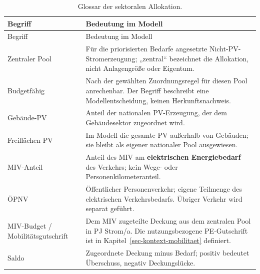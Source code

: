 \documentclass[
  ngerman,
  a4paper,
  DIV=11]{scrreprt}
\begin{document}
\begin{longtable}[]{@{}
  >{\raggedright\arraybackslash}p{}
  >{\raggedright\arraybackslash}p{}@{}}
\caption{Glossar der sektoralen
Allokation.}\label{tbl-allokation-glossar}\tabularnewline
\toprule\noalign{}
\begin{minipage}[b]{\linewidth}\raggedright
Begriff
\end{minipage} & \begin{minipage}[b]{\linewidth}\raggedright
Bedeutung im Modell
\end{minipage} \\
\midrule\noalign{}
\endfirsthead
\toprule\noalign{}
\begin{minipage}[b]{\linewidth}\raggedright
Begriff
\end{minipage} & \begin{minipage}[b]{\linewidth}\raggedright
Bedeutung im Modell
\end{minipage} \\
\midrule\noalign{}
\endhead
\bottomrule\noalign{}
\endlastfoot
Zentraler Pool & Für die priorisierten Bedarfe angesetzte
Nicht-PV-Stromerzeugung; „zentral`` bezeichnet die Allokation, nicht
Anlagengröße oder Eigentum. \\
Budgetfähig & Nach der gewählten Zuordnungsregel für diesen Pool
anrechenbar. Der Begriff beschreibt eine Modellentscheidung, keinen
Herkunftsnachweis. \\
Gebäude-PV & Anteil der nationalen PV-Erzeugung, der dem Gebäudesektor
zugeordnet wird. \\
Freiflächen-PV & Im Modell die gesamte PV außerhalb von Gebäuden; sie
bleibt als eigener nationaler Pool ausgewiesen. \\
MIV-Anteil & Anteil des MIV am \textbf{elektrischen Energiebedarf} des
Verkehrs; kein Wege- oder Personenkilometeranteil. \\
ÖPNV & Öffentlicher Personenverkehr; eigene Teilmenge des elektrischen
Verkehrsbedarfs. Übriger Verkehr wird separat geführt. \\
MIV-Budget / Mobilitätsgutschrift & Dem MIV zugeteilte Deckung aus dem
zentralen Pool in PJ Strom/a. Die nutzungsbezogene PE-Gutschrift ist in
Kapitel~\ref{sec-kontext-mobilitaet} definiert. \\
Saldo & Zugeordnete Deckung minus Bedarf; positiv bedeutet Überschuss,
negativ Deckungslücke. \\
\end{longtable}
\end{document}
